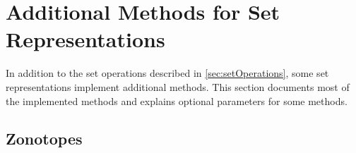 \section{Additional Methods for Set Representations}

In addition to the set operations described in \cref{sec:setOperations}, some set representations implement additional methods. This section documents most of the implemented methods and explains optional parameters for some methods.



\subsection{Zonotopes} \label{sec:zonotopeOperations}

